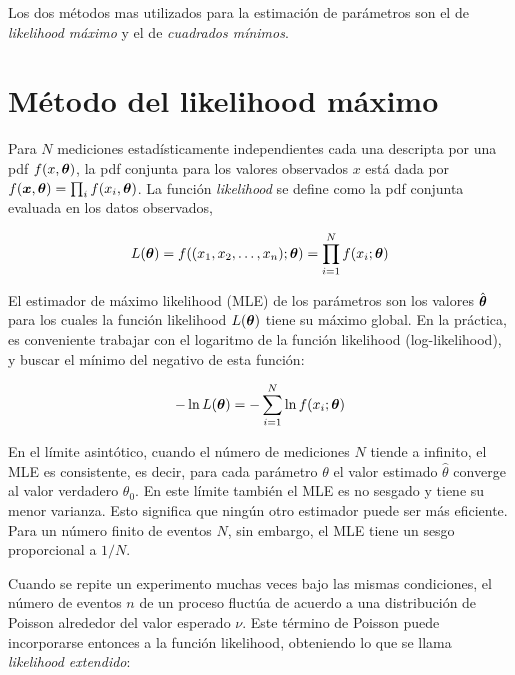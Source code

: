 Los dos métodos mas utilizados para la estimación de parámetros son el de
\emph{likelihood máximo} y el de \emph{cuadrados mínimos}.


\section{Método del likelihood máximo}\label{sec:MLE}

Para $N$ mediciones estadísticamente independientes cada una descripta por una
pdf $f(x, \bm{\theta})$, la pdf conjunta para los valores observados $x$ está dada
por $f(\bm{x}, \bm{\theta}) = \prod_i f(x_i, \bm{\theta})$. La función \emph{likelihood}
se define como la pdf conjunta evaluada en los datos observados,

\begin{equation}
  L(\bm{\theta}) = f((x_1, x_2, \ldots, x_n); \bm{\theta}) = \prod_{i=1}^{N} f(x_i;
  \bm{\theta})
\end{equation}

El estimador de máximo likelihood (MLE) de los parámetros {\btheta} son los
valores $\hat{\bm{\theta}}$ para los cuales la función likelihood $L(\bm{\theta})$ tiene
su máximo global. %
En la práctica, es conveniente trabajar con el logaritmo de la función
likelihood (log-likelihood), y buscar el mínimo del negativo de esta función:

\begin{equation}
  - \ln L(\bm{\theta}) = - \sum_{i=1}^{N} \ln f(x_i; \bm{\theta})
\end{equation}

En el límite asintótico, cuando el número de mediciones $N$ tiende a infinito,
el MLE es consistente, es decir, para cada parámetro $\theta$ el valor estimado
$\hat{\theta}$ converge al valor verdadero $\theta_0$. En este límite también el
MLE es no sesgado y tiene su menor varianza. Esto significa que ningún otro
estimador puede ser más eficiente. Para un número finito de eventos $N$, sin
embargo, el MLE tiene un sesgo proporcional a $1/N$.


Cuando se repite un experimento muchas veces bajo las mismas condiciones, el
número de eventos $n$ de un proceso fluctúa de acuerdo a una distribución
de Poisson alrededor del valor esperado $\nu$. Este término de Poisson puede
incorporarse entonces a la función likelihood, obteniendo lo que se llama
\emph{likelihood extendido}:

